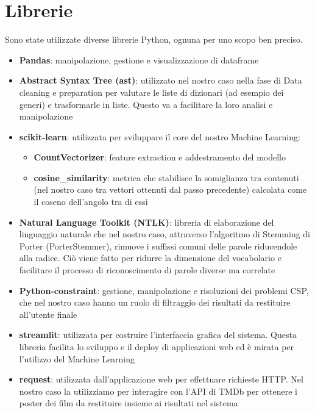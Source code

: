 \documentclass{report}
\begin{document}
    \section{Librerie}
        Sono state utilizzate diverse librerie Python, ognuna per uno scopo ben preciso. \\
        \begin{itemize}
            \item \textbf{Pandas}: manipolazione, gestione e visualizzazione di dataframe
            \item \textbf{Abstract Syntax Tree (ast)}: utilizzato nel nostro caso nella fase di Data cleaning e preparation per valutare le liste di dizionari (ad esempio dei generi) e trasformarle in liste. Questo va a facilitare la loro analisi e manipolazione
            \item \textbf{scikit-learn}: utilizzata per sviluppare il core del nostro Machine Learning:
            \begin{itemize}
                \item \textbf{CountVectorizer}: feature extraction e addestramento del modello
                \item \textbf{cosine\_similarity}: metrica che stabilisce la somiglianza tra contenuti (nel nostro caso tra vettori ottenuti dal passo precedente) calcolata come il coseno dell'angolo tra di essi
            \end{itemize}
            \item \textbf{Natural Language Toolkit (NTLK)}: libreria di elaborazione del linguaggio naturale che nel nostro caso, attraverso l'algoritmo di Stemming di Porter (PorterStemmer), rimuove i suffissi comuni delle parole riducendole alla radice. Ciò viene fatto per ridurre la dimensione del vocabolario e facilitare il processo di riconoscimento di parole diverse ma correlate
            \item \textbf{Python-constraint}: gestione, manipolazione e risoluzioni dei problemi CSP, che nel nostro caso hanno un ruolo di filtraggio dei risultati da restituire all'utente finale
            \item \textbf{streamlit}: utilizzata per costruire l'interfaccia grafica del sistema. Questa libreria facilita lo sviluppo e il deploy di applicazioni web ed è mirata per l'utilizzo del Machine Learning
            \item \textbf{request}: utilizzata dall'applicazione web per effettuare richieste HTTP. Nel nostro caso la utilizziamo per interagire con l'API di TMDb per ottenere i poster dei film da restituire insieme ai risultati nel sistema
        \end{itemize}
\end{document}
